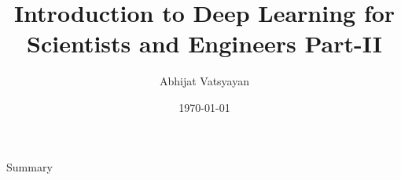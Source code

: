 \documentclass[handout,t]{beamer}
\title[Deep Neural Networks Basics Part-II]{
	Introduction to Deep Learning for Scientists and Engineers Part-II}
\date{
	\today}
\author[Abhijat Vatsyayan]{
	Abhijat Vatsyayan \inst{1}\\
}
\institute[ Enterprise Information Strategy and Risk Management,]{
		\inst{1}%
		Enterprise Information Stragtegy and Risk Management\\	
	}
\begin{document}
	
\setlength{\abovedisplayskip}{0pt}
\setlength{\belowdisplayskip}{0pt}
\setlength{\abovedisplayshortskip}{0pt}
\setlength{\belowdisplayshortskip}{0pt}

\frame{\titlepage}
\section[]{}
\begin{frame}{Summary}
	\tableofcontents
\end{frame}







\end{document}
